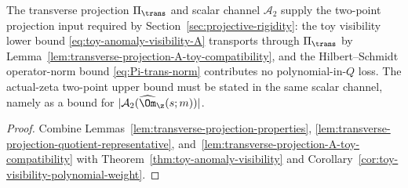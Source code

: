 \begin{lemma}
\label{lem:transverse-projection-sufficient}
The transverse projection \(\Pi_\trans\) and scalar channel
\(\mathcal A_2\) supply the two-point projection input required by
Section~\ref{sec:projective-rigidity}: the toy visibility lower bound
\eqref{eq:toy-anomaly-visibility-A} transports through \(\Pi_\trans\)
by Lemma~\ref{lem:transverse-projection-A-toy-compatibility}, and the
Hilbert--Schmidt operator-norm bound \eqref{eq:Pi-trans-norm}
contributes no polynomial-in-\(Q\) loss.  The actual-zeta two-point
upper bound must be stated in the same scalar channel, namely as a
bound for \(|\mathcal A_2(\widehat\Om_\z(s;m))|\).
\end{lemma}

\begin{proof}
Combine Lemmas~\ref{lem:transverse-projection-properties},
\ref{lem:transverse-projection-quotient-representative},
and~\ref{lem:transverse-projection-A-toy-compatibility} with
Theorem~\ref{thm:toy-anomaly-visibility} and
Corollary~\ref{cor:toy-visibility-polynomial-weight}.
\end{proof}
